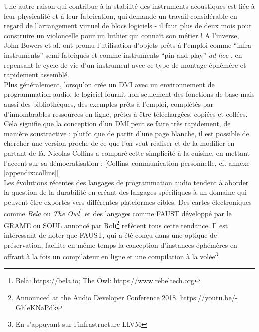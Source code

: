 \noindent Une autre raison qui contribue à la stabilité des instruments acoustiques est liée à leur physicalité et à leur fabrication, qui demande un travail considérable en regard de l'arrangement virtuel de blocs logiciels - il faut plus de deux mois pour construire un violoncelle pour un luthier qui connaît son métier ! A l'inverse, John Bowers et al. ont promu l'utilisation d'objets prêts à l'emploi comme ``infra-instruments'' semi-fabriqués \cite{bowers_not_2005} et comme instruments ``pin-and-play'' \textit{ad hoc} \cite{bowers_creating_2006}, en repensant le cycle de vie d'un instrument avec ce type de montage éphémère et rapidement assemblé.\\
\indent Plus généralement, lorsqu'on crée un \gls{DMI} avec un environnement de programmation audio, le logiciel fournit non seulement des fonctions de base mais aussi des bibliothèques, des exemples prêts à l'emploi, complétés par d'innombrables ressources en ligne, prêtes à être téléchargées, copiées et collées.\\
\indent Cela signifie que la conception d'un \gls{DMI} peut se faire très rapidement, de manière soustractive : plutôt que de partir d'une page blanche, il est possible de chercher une version proche de ce que l'on veut réaliser et de la modifier en partant de là. Nicolas Collins a comparé cette simplicité à la cuisine, en mettant l'accent sur sa démocratisation :  [Collins, communication personnelle, cf. annexe \ref{appendix:collins}]\\
\indent Les évolutions récentes des langages de programmation audio tendent à aborder la question de la durabilité en créant des langages spécifiques à un domaine qui peuvent être exportés vers différentes plateformes cibles. Des cartes électroniques comme \textit{Bela} ou \textit{The Owl}\footnote{Bela: \url{https://bela.io}; The Owl: \url{https://www.rebeltech.org}} et des langages comme \gls{FAUST} développé par le \gls{GRAME} \cite{orlarey_faust_2008} ou SOUL annoncé par Roli\footnote{Announced at the Audio Developer Conference 2018. \url{https://youtu.be/-GhleKNaPdk}} reflètent tous cette tendance. Il est intéressant de noter que \gls{FAUST}, qui a été conçu dans une optique de préservation, facilite en même temps la conception d'instances éphémères en offrant à la fois un compilateur en ligne et une compilation à la volée\footnote{En s'appuyant sur l'infrastructure \gls{LLVM}}.
	
